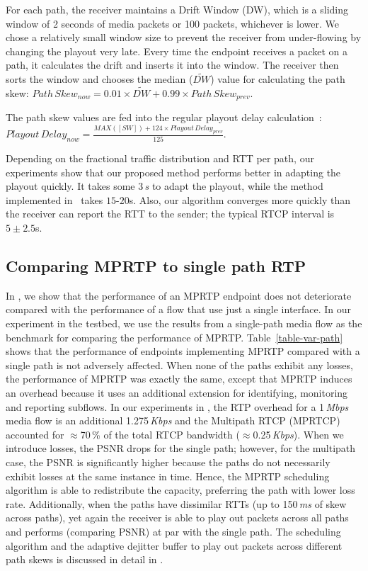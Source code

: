 For each path, the receiver maintains a Drift Window (DW), which is a sliding
window of 2 seconds of media packets or 100 packets, whichever is lower. We
chose a relatively small window size to prevent the receiver from under-flowing
by changing the playout very late. Every time the endpoint receives a packet
on a path, it calculates the drift and inserts it into the window. The
receiver then sorts the window and chooses the median ($\widetilde{DW}$) value
for calculating the path skew: $Path\,Skew_{now} = 0.01 \times \widetilde{DW} + 0.99
\times Path\,Skew_{prev}$. 

The path skew values are fed into the regular playout delay
calculation~\cite{Fober05,Colin03}: $Playout\,Delay_{now} = \frac{MAX([SW]) + 124
\times Playout\,Delay_{prev}}{125}$.

Depending on the fractional traffic distribution and RTT per path, our
experiments show that our proposed method performs better in adapting the
playout quickly. It takes some 3\,\emph{s} to adapt the playout, while the method
implemented in~\cite{Fober05,Colin03} takes $15$-$20$s. Also, our algorithm
converges more quickly than the receiver can report the RTT to the sender; the
typical RTCP interval is $5\pm2.5$s.

\subsection{Comparing MPRTP to single path RTP}

In , we show that the performance of an MPRTP
endpoint does not deteriorate compared with the performance of a flow
that use just a single interface. In our experiment in the testbed, we use the
results from a single-path media flow as the benchmark for comparing the
performance of MPRTP. Table~\ref{table-var-path} shows that the performance of
endpoints implementing MPRTP compared with a single path is not adversely
affected. When none of the paths exhibit any losses, the performance of MPRTP
was exactly the same, except that MPRTP induces an overhead because it uses an
additional extension for identifying, monitoring and reporting subflows. In
our experiments in , the RTP overhead for a 1\,\emph{Mbps} media flow
is an additional 1.275\,\emph{Kbps} and the Multipath RTCP (MPRTCP) accounted
for $\approx$70\,\% of the total RTCP bandwidth ($\approx$0.25\,\emph{Kbps}).
When we introduce losses, the PSNR drops for the single path; however, for the
multipath case, the PSNR is significantly higher because the paths do not
necessarily exhibit losses at the same instance in time. Hence, the MPRTP
scheduling algorithm is able to redistribute the capacity, preferring the
path with lower loss rate. Additionally, when the paths have dissimilar RTTs
(up to 150\,\emph{ms} of skew across paths), yet again the receiver is able to
play out packets across all paths and performs (comparing PSNR) at par with the
single path. The scheduling algorithm and the adaptive dejitter buffer to
play out packets across different path skews is discussed in detail in
.

